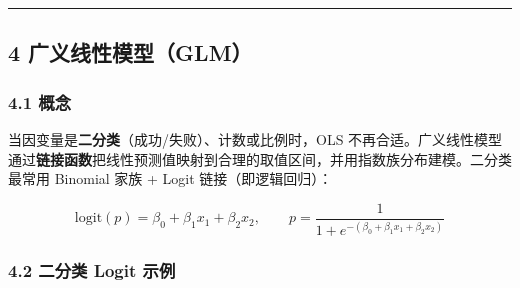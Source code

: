 \begin{center}\rule{0.5\linewidth}{0.5pt}\end{center}

\subsection{4
广义线性模型（GLM）}\label{ux5e7fux4e49ux7ebfux6027ux6a21ux578bglm}

\subsubsection{4.1 概念}\label{ux6982ux5ff5-1}

当因变量是\textbf{二分类}（成功/失败）、计数或比例时，OLS
不再合适。广义线性模型通过\textbf{链接函数}把线性预测值映射到合理的取值区间，并用指数族分布建模。二分类最常用
Binomial 家族 + Logit 链接（即逻辑回归）：

\[
\text{logit}(p) = \beta_0 + \beta_1 x_1 + \beta_2 x_2,\qquad
p = \frac{1}{1+e^{-(\beta_0+\beta_1 x_1+\beta_2 x_2)}}
\]

\subsubsection{4.2 二分类 Logit
示例}\label{ux4e8cux5206ux7c7b-logit-ux793aux4f8b}

\begin{Shaded}
\begin{Highlighting}[]

\OperatorTok{=}\NormalTok{)}
\OperatorTok{=}\NormalTok{, }\NormalTok{, (}\NormalTok{, }\NormalTok{))}
\OperatorTok{=}  \OperatorTok{+} \OperatorTok{*}\NormalTok{X\_raw[:, }\NormalTok{] }\OperatorTok{{-}} \OperatorTok{*}\NormalTok{X\_raw[:, }\NormalTok{]}
\OperatorTok{=} \OperatorTok{/}\NormalTok{(}\OperatorTok{+}\OperatorTok{{-}}
\OperatorTok{=}

\OperatorTok{=}
\OperatorTok{=}\OperatorTok{=}
\OperatorTok{=}\NormalTok{ sm.add\_constant(np.array([[}\NormalTok{, }\NormalTok{], [}\NormalTok{, }\NormalTok{]]))}
\end{Highlighting}
\end{Shaded}

